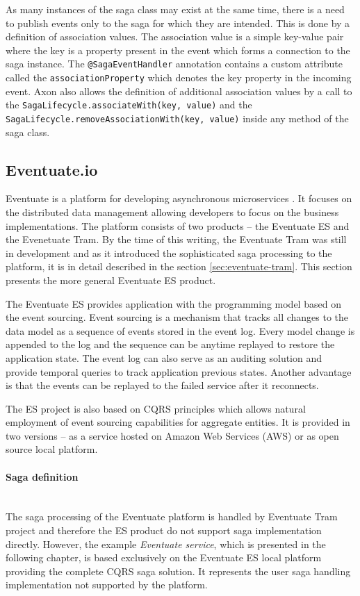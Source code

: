 \documentclass[oneside,
  digital, %
  table,   %
  nolof,     %
  nolot,     %
]{fithesis3}
\newcommand{\newlinepar}[1]{\paragraph{#1}\needspace{4\baselineskip}\mbox{}\\}
\begin{document}
As many instances of the saga class may exist at the same time, there is a need to publish events only to the saga for which they are intended. This is done by a definition of association values. The association value is a simple key-value pair where the key is a property present in the event which forms a connection to the saga instance. The \texttt{@SagaEventHandler} annotation contains a custom attribute called the \texttt{associationProperty} which denotes the key property in the incoming event. Axon also allows the definition of additional association values by a call to the \texttt{SagaLifecycle.associateWith(key, value)} and the \texttt{SagaLifecycle.removeAssociationWith(key, value)} inside any method of the saga class.

\subsection{Eventuate.io}

Eventuate is a platform for developing asynchronous microservices \cite{eventuate.io}. It focuses on the distributed data management allowing developers to focus on the business implementations. The platform consists of two products -- the Eventuate ES and the Evenetuate Tram. By the time of this writing, the Eventuate Tram was still in development and as it introduced the sophisticated saga processing to the platform, it is in detail described in the section \ref{sec:eventuate-tram}. This section presents the more general Eventuate ES product.

The Eventuate ES provides application with the programming model based on the event sourcing. Event sourcing is a mechanism that tracks all changes to the data model as a sequence of events stored in the event log. Every model change is appended to the log and the sequence can be anytime replayed to restore the application state. The event log can also serve as an auditing solution and provide temporal queries to track application previous states. Another advantage is that the events can be replayed to the failed service after it reconnects.


The ES project is also based on CQRS principles which allows natural employment of event sourcing capabilities for aggregate entities. It is provided in two versions -- as a service hosted on Amazon Web Services (AWS) or as open source local platform.

\newlinepar{Saga definition}

The saga processing of the Eventuate platform is handled by Eventuate Tram project and therefore the ES product do not support saga implementation directly. However, the example \textit{Eventuate service}, which is presented in the following chapter, is based exclusively on the Eventuate ES local platform providing the complete CQRS saga solution. It represents the user saga handling implementation not supported by the platform. 
\end{document}
